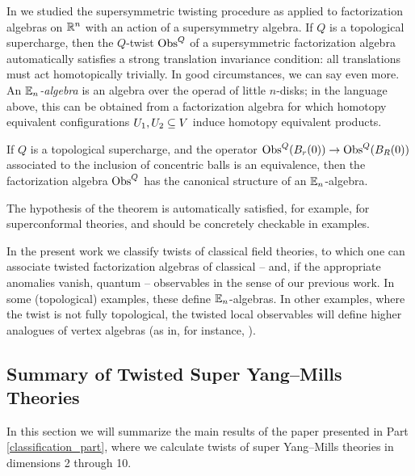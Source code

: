 \documentclass[10pt, oneside]{article}
\begin{document}
In \cite{ElliottSafronov} we studied the supersymmetric twisting procedure as applied to factorization algebras on $\mathbb R^n$ with an action of a supersymmetry algebra.  If $Q$ is a topological supercharge, then the $Q$-twist $\mathrm{Obs}^Q$ of a supersymmetric factorization algebra automatically satisfies a strong translation invariance condition: all translations must act homotopically trivially.  In good circumstances, we can say even more.  An \emph{$\mathbb{E}_n$-algebra} is an algebra over the operad of little $n$-disks; in the language above, this can be obtained from a factorization algebra for which homotopy equivalent configurations $U_1, U_2 \subseteq V$ induce homotopy equivalent products.
\begin{nonum}
If $Q$ is a topological supercharge, and the operator $\mathrm{Obs}^Q(B_r(0)) \to \mathrm{Obs}^Q(B_R(0))$ associated to the inclusion of concentric balls is an equivalence, then the factorization algebra $\mathrm{Obs}^Q$ has the canonical structure of an $\mathbb{E}_n$-algebra.
\end{nonum}
The hypothesis of the theorem is automatically satisfied, for example, for superconformal theories, and should be concretely checkable in examples.

In the present work we classify twists of classical field theories, to which one can associate twisted factorization algebras of classical -- and, if the appropriate anomalies vanish, quantum -- observables in the sense of our previous work.  In some (topological) examples, these define $\mathbb{E}_n$-algebras.  In other examples, where the twist is not fully topological, the twisted local observables will define higher analogues of vertex algebras (as in, for instance, \cite{GwilliamWilliamsKM}).


\subsection*{Summary of Twisted Super Yang--Mills Theories}

In this section we will summarize the main results of the paper presented in Part \ref{classification_part}, where we calculate twists of super Yang--Mills theories in dimensions 2 through 10.
\end{document}
